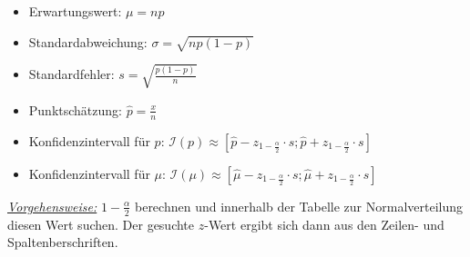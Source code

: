 \begin{itemize}
    \item Erwartungswert: \(\mu=np\)
    \item Standardabweichung: \(\sigma=\sqrt{np(1-p)}\)
    \item Standardfehler: \(s=\sqrt{\frac{p(1-p)}{n}}\)
    \item Punktschätzung: \(\hat{p}=\frac{x}{n}\)
    \item Konfidenzintervall für \(p\): \(\mathcal{I}(p)\approx \left[\hat{p}-z_{1-\frac{\alpha}{2}}\cdot s; \hat{p}+z_{1-\frac{\alpha}{2}}\cdot s\right]\)
    \item Konfidenzintervall für \(\mu\): \(\mathcal{I}(\mu)\approx \left[\hat{\mu}-z_{1-\frac{\alpha}{2}}\cdot s; \hat{\mu}+z_{1-\frac{\alpha}{2}}\cdot s\right]\)
\end{itemize}

\underline{\emph{Vorgehensweise:}} \(1-\frac{\alpha}{2}\) berechnen und innerhalb der Tabelle zur Normalverteilung diesen Wert suchen. Der gesuchte \(z\)-Wert ergibt sich dann aus den Zeilen- und Spaltenberschriften.\\